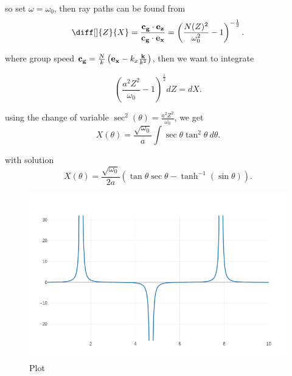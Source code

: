 so set $\omega = \omega_0$, then ray paths can be found from
\[
  \diff[]{Z}{X} = \frac{{\bf c_{g}}\cdot {\bf e_{z}}}{{\bf c_{g}}\cdot {\bf
  e_{x}}} = \left( \frac{N(Z)^2}{\omega_0^2} - 1\right)^{-\frac{1}{2}}
.\] 

where group speed ${\bf c_{g}} = \frac{N}{k} \left( {\bf e_{x}} - k_{x}
\frac{{\bf k}}{k^2}\right)$, then we want to integrate

\[
  \left(\frac{a^2Z^2}{\omega_0} - 1\right)^{\frac{1}{2}} dZ = dX
.\] 

using the change of variable $\sec^2(\theta ) = \frac{a^2Z^2}{\omega_0}$, we
get
\[
  X(\theta ) = \frac{\sqrt{\omega_0}}{a}\int {\sec \theta \tan^2 \theta } \: d{\theta } 
.\] 

with solution
\[
  X(\theta ) = \frac{\sqrt{\omega_0}}{2a} \left( \tan \theta \sec \theta
  - \tanh^{-1} (\sin \theta ) \right)
.\] 

\graphicspath{{./assignment_03/figures/}}
\begin{figure}[H]
  \centering
  \includegraphics[width=0.8\linewidth]{plot.png}
  \caption{Plot}%
  \label{fig:plot}
\end{figure}
